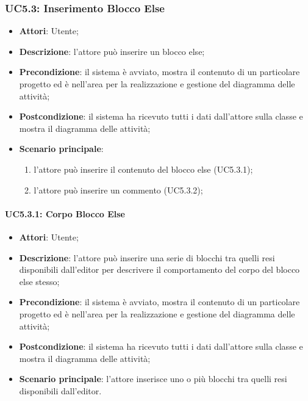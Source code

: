 \subsubsection{UC5.3: Inserimento Blocco Else}
\label{UC5.3}
\begin{itemize}
	\item \textbf{Attori}: Utente;
	\item \textbf{Descrizione}: l'attore può inserire un blocco else;
	\item \textbf{Precondizione}: il sistema è avviato, mostra il contenuto di un particolare progetto ed è nell'area per la realizzazione e gestione del diagramma delle attività;
	\item \textbf{Postcondizione}: il sistema ha ricevuto tutti i dati dall'attore sulla classe e mostra il diagramma delle attività;
	\item \textbf{Scenario principale}:
	\begin{enumerate}
		\item l'attore può inserire il contenuto del blocco else (UC5.3.1);
		\item l'attore può inserire un commento (UC5.3.2);
	\end{enumerate}
\end{itemize}

\paragraph{UC5.3.1: Corpo Blocco Else}
\label{UC5.3.1}
\begin{itemize}
	\item \textbf{Attori}: Utente;
	\item \textbf{Descrizione}: l'attore può inserire una serie di blocchi tra quelli resi disponibili dall'editor per descrivere il comportamento del corpo del blocco else stesso;
	\item \textbf{Precondizione}: il sistema è avviato, mostra il contenuto di un particolare progetto ed è nell'area per la realizzazione e gestione del diagramma delle attività;
	\item \textbf{Postcondizione}: il sistema ha ricevuto tutti i dati dall'attore sulla classe e mostra il diagramma delle attività;
	\item \textbf{Scenario principale}: l'attore inserisce uno o più blocchi tra quelli resi disponibili dall'editor.
\end{itemize}

